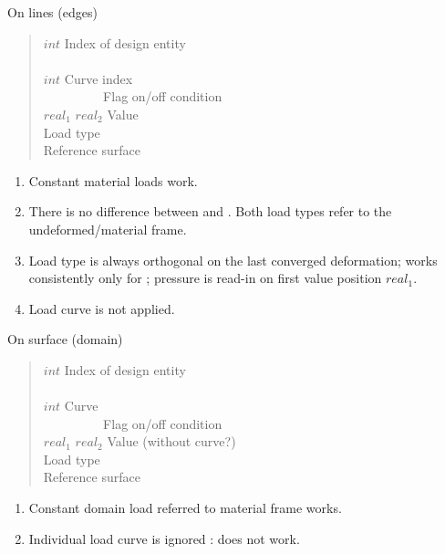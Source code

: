 On lines (edges)
\begin{quote}
 $int$ \cnl \chs Index of design entity\\
\cod{-} \cnl\\
\cgb {} \cor $int$ \cge \cnl \chs Curve index\\
\cgb\  \cor\  \cge\ \cgb\  \cor\  \cge\  \cnl \chs Flag on/off condition \\
$real_1$ $real_2$  \cnl \chs Value\\
\cgb {} \cor {} \cor {} \cge \cnl \chs Load type\\
 \chs Reference surface
\end{quote}
\begin{enumerate}
\item Constant material loads work.
\item There is no difference between  and . Both load types
refer to the undeformed/material frame.
\item
Load type  is always orthogonal on the last converged
deformation; works consistently only for ; pressure is read-in on
first value position $real_1$.
\item Load curve is not applied.
\end{enumerate}




On surface (domain)
\begin{quote}
 $int$ \cnl \chs Index of design entity\\
\cod{-} \cnl\\
\cgb {} \cor $int$ \cge \chs Curve\\
\cgb\  \cor\  \cge\ \cgb\  \cor\  \cge\  \cnl \chs Flag on/off condition \\
$real_1$ $real_2$  \cnl \chs Value (without curve?)\\
 \cnl \chs Load type\\
 \chs Reference surface
\end{quote}
\begin{enumerate}
\item Constant domain load referred to material frame works.
\item Individual load curve is ignored : does not work.
\end{enumerate}


